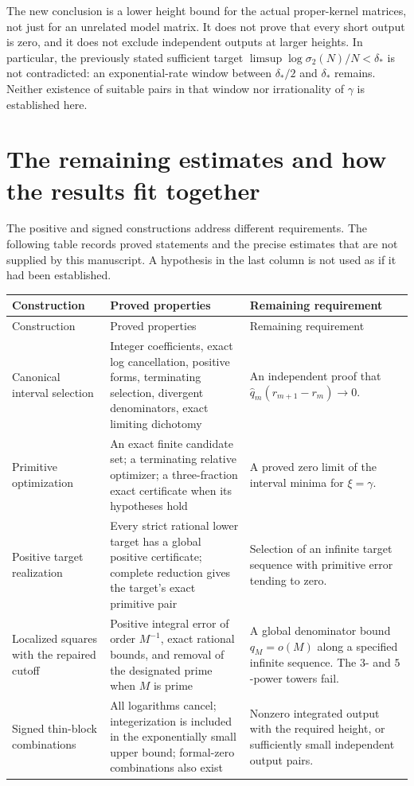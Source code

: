 \documentclass[11pt,a4paper]{article}
\theoremstyle{definition}
\theoremstyle{remark}
\begin{document}
The new conclusion is a lower height bound for the actual
proper-kernel matrices, not just for an unrelated model matrix.
It does not prove that every short output is zero, and it does
not exclude independent outputs at larger heights.
In particular, the previously stated sufficient target
$\limsup\log\sigma_2(N)/N<\delta_*$ is not contradicted:
an exponential-rate window between $\delta_*/2$ and $\delta_*$
remains.  Neither existence of suitable pairs in that window nor
irrationality of $\gamma$ is established here.

\section{The remaining estimates and how the results fit together}
\label{unified-final-scope}

The positive and signed constructions address different requirements.
The following table records proved statements and the precise estimates
that are not supplied by this manuscript. A hypothesis in the last column
is not used as if it had been established.

\small
\begin{longtable}{@{}>{\raggedright\arraybackslash}p{}
 >{\raggedright\arraybackslash}p{}
 >{\raggedright\arraybackslash}p{}@{}}
\toprule Construction & Proved properties & Remaining requirement\\\midrule
\endfirsthead
\toprule Construction & Proved properties & Remaining requirement\\\midrule
\endhead
Canonical interval selection &
Integer coefficients, exact log cancellation, positive forms, terminating
selection, divergent denominators, exact limiting dichotomy &
An independent proof that
\(\widehat q_m(r_{m+1}-r_m)\to0\).\\
Primitive optimization &
An exact finite candidate set; a terminating relative optimizer; a
three-fraction exact certificate when its hypotheses hold &
A proved zero limit of the interval minima for \(\xi=\gamma\).\\
Positive target realization &
Every strict rational lower target has a global positive certificate;
complete reduction gives the target's exact primitive pair &
Selection of an infinite target sequence with primitive error tending
to zero.\\
Localized squares with the repaired cutoff &
Positive integral error of order \(M^{-1}\), exact rational bounds,
and removal of the designated prime when \(M\) is prime &
A global denominator bound \(q_M=o(M)\) along a specified infinite
sequence. The \(3\)- and \(5\)-power towers fail.\\
Signed thin-block combinations &
All logarithms cancel; integerization is included in the exponentially
small upper bound; formal-zero combinations also exist &
Nonzero integrated output with the required height, or sufficiently
small independent output pairs.\\
\bottomrule
\end{longtable}
\normalsize
\end{document}
